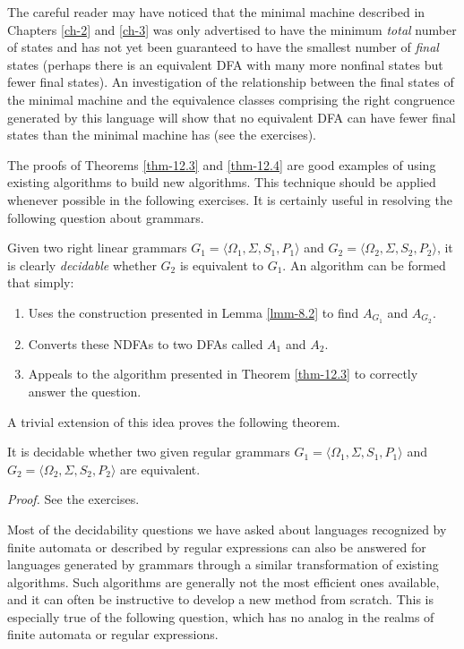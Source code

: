 The careful reader may have noticed that the minimal machine described in
Chapters \ref{ch-2} and \ref{ch-3} was only advertised to have the minimum
\emph{total} number of states and has not yet been guaranteed to have the smallest
number of \emph{final} states (perhaps there is an equivalent DFA with many
more nonfinal states but fewer final states). An investigation of the
relationship between the final states of the minimal machine and the equivalence
classes comprising the right congruence generated by this language will show
that no equivalent DFA can have fewer final states than the minimal machine
has (see the exercises).

The proofs of Theorems \ref{thm-12.3} and \ref{thm-12.4} are good examples of
using existing algorithms to build new algorithms. This technique should be
applied whenever possible in the following exercises. It is certainly useful in
resolving the following question about grammars.

Given two right linear grammars $G_1=\langle\Omega_1,\Sigma,S_1,P_1\rangle$ and
$G_2=\langle\Omega_2,\Sigma,S_2,P_2\rangle$, it is clearly \emph{decidable}
whether $G_2$ is equivalent to $G_1$. An algorithm can be formed that simply:
\begin{enumerate}
\item Uses the construction presented in Lemma \ref{lmm-8.2} to find $A_{G_1}$
	and $A_{G_2}$.
\item Converts these NDFAs to two DFAs called $A_1$ and $A_2$.
\item Appeals to the algorithm presented in Theorem \ref{thm-12.3} to correctly
answer the question.
\end{enumerate}
A trivial extension of this idea proves the following theorem.

\begin{thm}\label{thm-12.5}
It is decidable whether two given regular grammars $G_1=\langle\Omega_1,\Sigma,
S_1,P_1\rangle$ and $G_2=\langle\Omega_2,\Sigma,S_2,P_2\rangle$ are equivalent.

\emph{Proof.} See the exercises.
\end{thm}

Most of the decidability questions we have asked about languages recognized
by finite automata or described by regular expressions can also be answered
for languages generated by grammars through a similar transformation of existing
algorithms. Such algorithms are generally not the most efficient ones available,
and it can often be instructive to develop a new method from scratch. This is
especially true of the following question, which has no analog in the realms of
finite automata or regular expressions.

